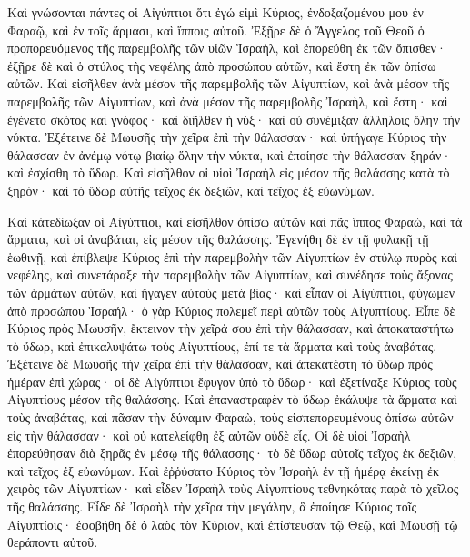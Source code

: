 {Καὶ γνώσονται πάντες οἱ Αἰγύπτιοι ὅτι ἐγώ εἰμὶ Κύριος, ἐνδοξαζομένου μου ἐν Φαραῷ, καὶ ἐν τοῖς ἅρμασι, καὶ ἵπποις αὐτοῦ.
Ἐξῇρε δὲ ὁ Ἄγγελος τοῦ Θεοῦ ὁ προπορευόμενος τῆς παρεμβολῆς τῶν υἱῶν Ἰσραὴλ, καὶ ἐπορεύθη ἐκ τῶν ὄπισθεν· ἐξῇρε δὲ καὶ ὁ στύλος τὴς νεφέλης ἀπὸ προσώπου αὐτῶν, καὶ ἔστη ἐκ τῶν ὀπίσω αὐτῶν.
Καὶ εἰσῆλθεν ἀνὰ μέσον τῆς παρεμβολῆς τῶν Αἰγυπτίων, καὶ ἀνὰ μέσον τῆς παρεμβολῆς τῶν Αἰγυπτίων, καὶ ἀνὰ μέσον τῆς παρεμβολῆς Ἰσραὴλ, καὶ ἔστη· καὶ ἐγένετο σκότος καὶ γνόφος· καὶ διῆλθεν ἡ νύξ· καὶ οὐ συνέμιξαν ἀλλήλοις ὅλην τὴν νύκτα.
Ἐξέτεινε δὲ Μωυσῆς τὴν χεῖρα ἐπὶ τὴν θάλασσαν· καὶ ὑπήγαγε Κύριος τὴν θάλασσαν ἐν ἀνέμῳ νότῳ βιαίῳ ὅλην τὴν νύκτα, καὶ ἐποίησε τὴν θάλασσαν ξηράν· καὶ ἐσχίσθη τὸ ὕδωρ.
Καὶ εἰσῆλθον οἱ υἱοὶ Ἰσραὴλ εἰς μέσον τῆς θαλάσσης κατὰ τὸ ξηρόν· καὶ τὸ ὕδωρ αὐτῆς τεῖχος ἐκ δεξιῶν, καὶ τεῖχος ἐξ εὐωνύμων.
\par }{\PP {}Καὶ κάτεδίωξαν οἱ Αἰγύπτιοι, καὶ εἰσῆλθον ὀπίσω αὐτῶν καὶ πᾶς ἵππος Φαραὼ, καὶ τὰ ἅρματα, καὶ οἱ ἀναβάται, εἰς μέσον τῆς θαλάσσης.
Ἐγενήθη δὲ ἐν τῇ φυλακῇ τῇ ἑωθινῇ, καὶ ἐπίβλεψε Κύριος ἐπὶ τὴν παρεμβολὴν τῶν Αἰγυπτίων ἐν στύλῳ πυρὸς καὶ νεφέλης, καὶ συνετάραξε τὴν παρεμβολὴν τῶν Αἰγυπτίων,
καὶ συνέδησε τοὺς ἄξονας τῶν ἁρμάτων αὐτῶν, καὶ ἤγαγεν αὐτοὺς μετὰ βίας· καὶ εἶπαν οἱ Αἰγύπτιοι, φύγωμεν ἀπὸ προσώπου Ἰσραήλ· ὁ γὰρ Κύριος πολεμεῖ περὶ αὐτῶν τοὺς Αἰγυπτίους.
Εἶπε δὲ Κύριος πρὸς Μωυσῆν, ἔκτεινον τὴν χεῖρά σου ἐπὶ τὴν θάλασσαν, καὶ ἀποκαταστήτω τὸ ὕδωρ, καὶ ἐπικαλυψάτω τοὺς Αἰγυπτίους, ἐπί τε τὰ ἅρματα καὶ τοὺς ἀναβάτας.
Ἐξέτεινε δὲ Μωυσῆς τὴν χεῖρα ἐπὶ τὴν θάλασσαν, καὶ ἀπεκατέστη τὸ ὕδωρ πρὸς ἡμέραν ἐπὶ χώρας· οἱ δὲ Αἰγύπτιοι ἔφυγον ὑπὸ τὸ ὕδωρ· καὶ ἐξετίναξε Κύριος τοὺς Αἰγυπτίους μέσον τῆς θαλάσσης.
Καὶ ἐπαναστραφὲν τὸ ὕδωρ ἐκάλυψε τὰ ἅρματα καὶ τοὺς ἀναβάτας, καὶ πᾶσαν τὴν δύναμιν Φαραὼ, τοὺς εἰσπεπορευμένους ὀπίσω αὐτῶν εἰς τὴν θάλασσαν· καὶ οὐ κατελείφθη ἐξ αὐτῶν οὐδὲ εἷς.
Οἱ δὲ υἱοὶ Ἰσραὴλ ἐπορεύθησαν διὰ ξηρᾶς ἐν μέσῳ τῆς θάλασσης· τὸ δὲ ὕδωρ αὐτοῖς τεῖχος ἐκ δεξιῶν, καὶ τεῖχος ἐξ εὐωνύμων.
Καὶ ἐῤῥύσατο Κύριος τὸν Ἰσραὴλ ἐν τῇ ἡμέρᾳ ἐκείνῃ ἐκ χειρὸς τῶν Αἰγυπτίων· καὶ εἶδεν Ἰσραὴλ τοὺς Αἰγυπτίους τεθνηκότας παρὰ τὸ χεῖλος τῆς θαλάσσης.
Εἶδε δὲ Ἰσραὴλ τὴν χεῖρα τὴν μεγάλην, ἃ ἐποίησε Κύριος τοῖς Αἰγυπτίοις· ἐφοβήθη δὲ ὁ λαὸς τὸν Κύριον, καὶ ἐπίστευσαν τῷ Θεῷ, καὶ Μωυσῇ τῷ θεράποντι αὐτοῦ.

}
